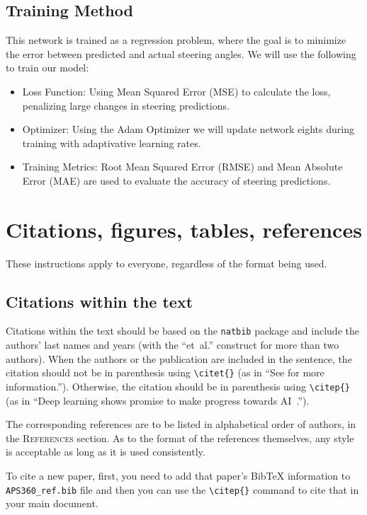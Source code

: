 \documentclass{article} %
\begin{document}
\subsection{Training Method}
This network is trained as a regression problem, where the goal is to minimize the error between predicted and actual
steering angles. We will use the following to train our model:
\begin{itemize}
  \item Loss Function: Using Mean Squared Error (MSE) to calculate the loss, penalizing large changes in steering
  predictions.
  \item Optimizer: Using the Adam Optimizer we will update network eights during training with adaptivative learning rates.
  \item Training Metrics: Root Mean Squared Error (RMSE) and Mean Absolute Error (MAE) are used to evaluate the accuracy of steering predictions.
\end{itemize}



\section{Citations, figures, tables, references}
\label{others}

These instructions apply to everyone, regardless of the format being used.

\subsection{Citations within the text}

Citations within the text should be based on the \texttt{natbib} package
and include the authors' last names and years (with the ``et~al.'' construct
for more than two authors). When the authors or the publication are
included in the sentence, the citation should not be in parenthesis using \verb|\citet{}| (as
in ``See \citet{Hinton06} for more information.''). Otherwise, the citation
should be in parenthesis using \verb|\citep{}| (as in ``Deep learning shows promise to make progress
towards AI~\citep{Bengio+chapter2007}.'').

The corresponding references are to be listed in alphabetical order of
authors, in the \textsc{References} section. As to the format of the
references themselves, any style is acceptable as long as it is used
consistently.

To cite a new paper, first, you need to add that paper's BibTeX information to \verb+APS360_ref.bib+ file and then you can use the \verb|\citep{}| command to cite that in your main document. 
\end{document}
